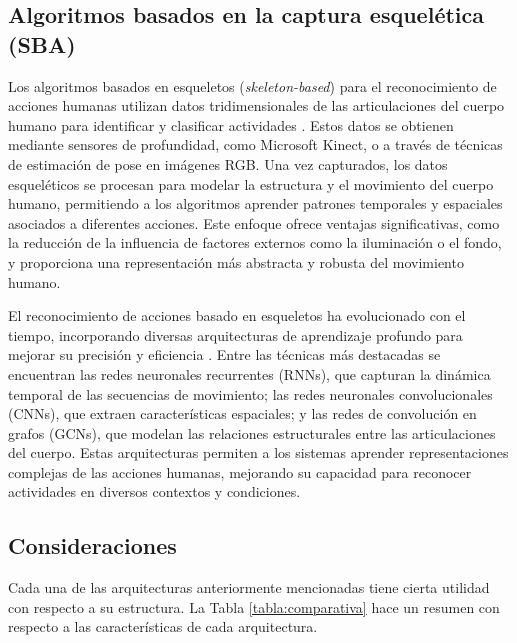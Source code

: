 \subsection{Algoritmos basados en la captura esquelética (SBA)}
\label{sba}

Los algoritmos basados en esqueletos (\textit{skeleton-based}) 
para el reconocimiento de acciones humanas utilizan datos 
tridimensionales de las articulaciones del cuerpo humano 
para identificar y clasificar actividades \cite{LoPresti2016}. Estos datos se 
obtienen mediante sensores de profundidad, como Microsoft 
Kinect, o a través de técnicas de estimación de pose en 
imágenes RGB. Una vez capturados, los datos esqueléticos se 
procesan para modelar la estructura y el movimiento del 
cuerpo humano, permitiendo a los algoritmos aprender patrones 
temporales y espaciales asociados a diferentes acciones. 
Este enfoque ofrece ventajas significativas, como la 
reducción de la influencia de factores externos como la 
iluminación o el fondo, y proporciona una representación más 
abstracta y robusta del movimiento humano.

El reconocimiento de acciones basado en esqueletos ha 
evolucionado con el tiempo, incorporando diversas arquitecturas 
de aprendizaje profundo para mejorar su precisión y 
eficiencia \cite{Ren2024}. Entre las técnicas más destacadas se encuentran 
las redes neuronales recurrentes (RNNs), que capturan la 
dinámica temporal de las secuencias de movimiento; las 
redes neuronales convolucionales (CNNs), que extraen 
características espaciales; y las redes de convolución en 
grafos (GCNs), que modelan las relaciones estructurales entre 
las articulaciones del cuerpo. Estas arquitecturas permiten 
a los sistemas aprender representaciones complejas de las 
acciones humanas, mejorando su capacidad para reconocer 
actividades en diversos contextos y condiciones.


\subsection{Consideraciones}

Cada una de las arquitecturas anteriormente mencionadas tiene 
cierta utilidad con respecto a su estructura. La Tabla
\ref{tabla:comparativa} hace un resumen con respecto a 
las características de cada arquitectura.

